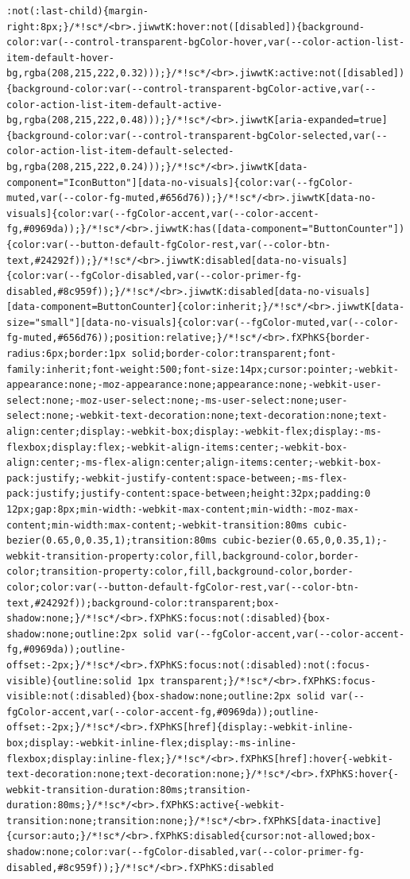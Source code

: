 \documentclass[
  letterpaper,
]{book}
\begin{document}
\begin{verbatim}
:not(:last-child){margin-right:8px;}/*!sc*/<br>.jiwwtK:hover:not([disabled]){background-color:var(--control-transparent-bgColor-hover,var(--color-action-list-item-default-hover-bg,rgba(208,215,222,0.32)));}/*!sc*/<br>.jiwwtK:active:not([disabled]){background-color:var(--control-transparent-bgColor-active,var(--color-action-list-item-default-active-bg,rgba(208,215,222,0.48)));}/*!sc*/<br>.jiwwtK[aria-expanded=true]{background-color:var(--control-transparent-bgColor-selected,var(--color-action-list-item-default-selected-bg,rgba(208,215,222,0.24)));}/*!sc*/<br>.jiwwtK[data-component="IconButton"][data-no-visuals]{color:var(--fgColor-muted,var(--color-fg-muted,#656d76));}/*!sc*/<br>.jiwwtK[data-no-visuals]{color:var(--fgColor-accent,var(--color-accent-fg,#0969da));}/*!sc*/<br>.jiwwtK:has([data-component="ButtonCounter"]){color:var(--button-default-fgColor-rest,var(--color-btn-text,#24292f));}/*!sc*/<br>.jiwwtK:disabled[data-no-visuals]{color:var(--fgColor-disabled,var(--color-primer-fg-disabled,#8c959f));}/*!sc*/<br>.jiwwtK:disabled[data-no-visuals] [data-component=ButtonCounter]{color:inherit;}/*!sc*/<br>.jiwwtK[data-size="small"][data-no-visuals]{color:var(--fgColor-muted,var(--color-fg-muted,#656d76));position:relative;}/*!sc*/<br>.fXPhKS{border-radius:6px;border:1px solid;border-color:transparent;font-family:inherit;font-weight:500;font-size:14px;cursor:pointer;-webkit-appearance:none;-moz-appearance:none;appearance:none;-webkit-user-select:none;-moz-user-select:none;-ms-user-select:none;user-select:none;-webkit-text-decoration:none;text-decoration:none;text-align:center;display:-webkit-box;display:-webkit-flex;display:-ms-flexbox;display:flex;-webkit-align-items:center;-webkit-box-align:center;-ms-flex-align:center;align-items:center;-webkit-box-pack:justify;-webkit-justify-content:space-between;-ms-flex-pack:justify;justify-content:space-between;height:32px;padding:0 12px;gap:8px;min-width:-webkit-max-content;min-width:-moz-max-content;min-width:max-content;-webkit-transition:80ms cubic-bezier(0.65,0,0.35,1);transition:80ms cubic-bezier(0.65,0,0.35,1);-webkit-transition-property:color,fill,background-color,border-color;transition-property:color,fill,background-color,border-color;color:var(--button-default-fgColor-rest,var(--color-btn-text,#24292f));background-color:transparent;box-shadow:none;}/*!sc*/<br>.fXPhKS:focus:not(:disabled){box-shadow:none;outline:2px solid var(--fgColor-accent,var(--color-accent-fg,#0969da));outline-offset:-2px;}/*!sc*/<br>.fXPhKS:focus:not(:disabled):not(:focus-visible){outline:solid 1px transparent;}/*!sc*/<br>.fXPhKS:focus-visible:not(:disabled){box-shadow:none;outline:2px solid var(--fgColor-accent,var(--color-accent-fg,#0969da));outline-offset:-2px;}/*!sc*/<br>.fXPhKS[href]{display:-webkit-inline-box;display:-webkit-inline-flex;display:-ms-inline-flexbox;display:inline-flex;}/*!sc*/<br>.fXPhKS[href]:hover{-webkit-text-decoration:none;text-decoration:none;}/*!sc*/<br>.fXPhKS:hover{-webkit-transition-duration:80ms;transition-duration:80ms;}/*!sc*/<br>.fXPhKS:active{-webkit-transition:none;transition:none;}/*!sc*/<br>.fXPhKS[data-inactive]{cursor:auto;}/*!sc*/<br>.fXPhKS:disabled{cursor:not-allowed;box-shadow:none;color:var(--fgColor-disabled,var(--color-primer-fg-disabled,#8c959f));}/*!sc*/<br>.fXPhKS:disabled 
\end{verbatim}
\end{document}
